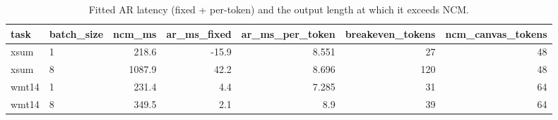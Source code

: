 \begin{table}[t]
\centering\small
\caption{Fitted AR latency (fixed + per-token) and the output length at which it exceeds NCM.}
\label{tab:output_length_breakeven}
\begin{tabular}{llrrrrr}
\toprule
task & batch\_size & ncm\_ms & ar\_ms\_fixed & ar\_ms\_per\_token & breakeven\_tokens & ncm\_canvas\_tokens \\
\midrule
xsum & 1 & 218.6 & -15.9 & 8.551 & 27 & 48 \\
xsum & 8 & 1087.9 & 42.2 & 8.696 & 120 & 48 \\
wmt14 & 1 & 231.4 & 4.4 & 7.285 & 31 & 64 \\
wmt14 & 8 & 349.5 & 2.1 & 8.9 & 39 & 64 \\
\bottomrule
\end{tabular}
\end{table}
